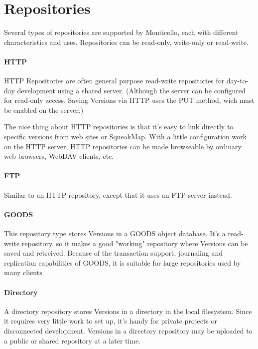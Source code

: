 \documentclass[a4paper,10pt,twoside]{book}
\begin{document}

\section{Repositories} 

Several types of repositories are supported by Monticello, each with different characteristics and uses. Repositories can be read-only, write-only or read-write.

\paragraph{HTTP} HTTP Repositories are often general purpose read-write repositories for day-to-day development using a shared server. (Although the server can be configured for read-only access. Saving Versions via HTTP uses the PUT method, wich must be enabled on the server.)

The nice thing about HTTP repositories is that it's easy to link directly to specific versions from web sites or SqueakMap. With a little configuration work on the HTTP server, HTTP repositories can be made browseable by ordinary web browsers, WebDAV clients, etc.

\paragraph{FTP} Similar to an HTTP repository, except that it uses an FTP server instead.

\paragraph{GOODS} This repository type stores Versions in a GOODS object database. It's a read-write repository, so it makes a good "working" repository where Versions can be saved and retreived. Because of the transaction support, journaling and replication capabilities of GOODS, it is suitable for large repositories used by many clients.

\paragraph{Directory} A directory repository stores Versions in a directory in the local filesystem. Since it requires very little work to set up, it's handy for private projects or disconnected development. Versions in a directory repository may be uploaded to a public or shared repository at a later time.
\end{document}
